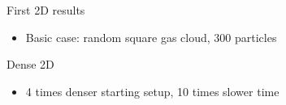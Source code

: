 \documentclass{beamer}
\begin{document}
\begin{frame}{First 2D results}
\begin{itemize}

\item Basic case: random square gas cloud, 300 particles

\end{itemize}
\end{frame}

\begin{frame}{Dense 2D}
\begin{itemize}

\item 4 times denser starting setup, 10 times slower time

\end{itemize}
\end{frame}
\end{document}
